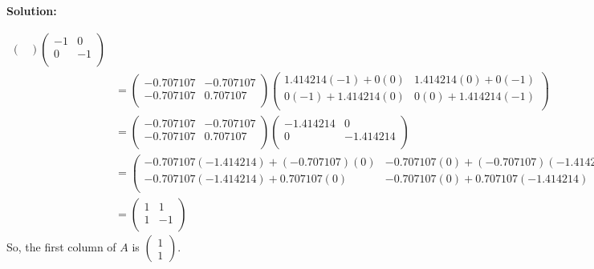 \documentclass[12pt]{article}
\newenvironment{solution}{
    \textbf{Solution:}
    
}{
    
    \vspace{2em}
}
\begin{document}
\begin{solution}
\[\begin{aligned}
\begin{pmatrix}
            \end{pmatrix}
            \begin{pmatrix}
                -1 & 0 \\
                0 & -1 \\
            \end{pmatrix} \\
            & = \begin{pmatrix}
                -0.707107 & -0.707107 \\
                -0.707107 & 0.707107 \\
            \end{pmatrix}
            \begin{pmatrix}
                1.414214(-1) + 0(0) & 1.414214(0) + 0(-1) \\
                0(-1) + 1.414214(0) & 0(0) + 1.414214(-1) \\
            \end{pmatrix} \\
            & = \begin{pmatrix}
                -0.707107 & -0.707107 \\
                -0.707107 & 0.707107 \\
            \end{pmatrix}
            \begin{pmatrix}
                -1.414214 & 0 \\
                0 & -1.414214 \\
            \end{pmatrix} \\
            & = \begin{pmatrix}
                -0.707107(-1.414214) + (-0.707107)(0) & -0.707107(0) + (-0.707107)(-1.414214) \\
                -0.707107(-1.414214) + 0.707107(0) & -0.707107(0) + 0.707107(-1.414214) \\
            \end{pmatrix} \\
            & = \begin{pmatrix}
                1 & 1 \\
                1 & -1 \\
            \end{pmatrix}
        \end{aligned}
    \]
    So, the first column of \(A\) is \(\begin{pmatrix} 1 \\ 1 \end{pmatrix}\).

\end{solution}
\end{document}
